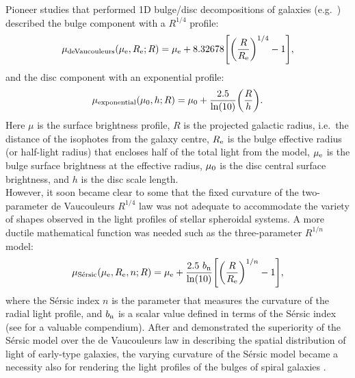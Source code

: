 Pioneer studies that performed 1D bulge/disc decompositions of galaxies (e.g.~\citealt{simiendevaucouleurs1986}) 
described the bulge component with a \cite{devaucouleurs1948} $R^{1/4}$ profile:
\begin{equation}
\mu_{\rm de Vaucouleurs}(\mu_{\rm e},R_{\rm e};R) = \mu_{\rm e} + 8.32678
\Biggl[\biggl(\frac{R}{R_{\rm e}}\biggr)^{1/4}-1\Biggr] ,
\end{equation} 
and the disc component with an exponential profile:
\begin{equation}
\mu_{\rm exponential}(\mu_{\rm 0},h;R) = \mu_{\rm 0} + \frac{2.5}{\ln(10)} \biggl(\frac{R}{h} \biggr) .
\end{equation} 
Here $\mu$ is the surface brightness profile, 
$R$ is the projected galactic radius, i.e.~the distance of the isophotes from the galaxy centre, 
$R_{\rm e}$ is the bulge effective radius (or half-light radius) that encloses half of the total light from the model, 
$\mu_{\rm e}$ is the bulge surface brightness at the effective radius, 
$\mu_{\rm 0}$ is the disc central surface brightness, 
and $h$ is the disc scale length. \\

However, it soon became clear to some that the fixed curvature of the two-parameter de Vaucouleurs $R^{1/4}$ law 
was not adequate to accommodate the variety of shapes observed in the light profiles of stellar spheroidal systems. 
A more ductile mathematical function was needed 
such as the three-parameter \cite{sersic1963,sersic1968} $R^{1/n}$ model: 
\begin{equation}
\mu_{\rm S\acute{e}rsic}(\mu_{\rm e},R_{\rm e},n;R) = \mu_{\rm e} + \frac{2.5~b_{\rm n}}{\ln(10)} 
\Biggl[\biggl(\frac{R}{R_{\rm e}}\biggr)^{1/n}-1\Biggr] ,
\end{equation}
where the S\'ersic index $n$ is the parameter that measures the curvature of the radial light profile,
and $b_{\rm n}$ is a scalar value defined in terms of the S\'ersic index 
(see \citealt{grahamdriver2005} for a valuable compendium). 
After \cite{caon1993} and \cite{donofrio1994} demonstrated the superiority of the S\'ersic model 
over the de Vaucouleurs law in describing the spatial distribution of light of early-type galaxies, 
the varying curvature of the S\'ersic model became a necessity also for rendering 
the light profiles of the bulges of spiral galaxies 
\citep{andredakis1995,moriondo1998,grahamprieto1999,khosroshahi2000,graham2001}. \\

